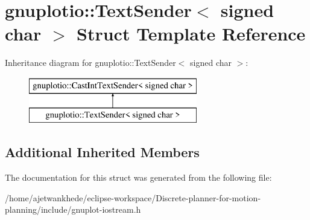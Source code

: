 \hypertarget{structgnuplotio_1_1TextSender_3_01signed_01char_01_4}{}\section{gnuplotio\+:\+:Text\+Sender$<$ signed char $>$ Struct Template Reference}
\label{structgnuplotio_1_1TextSender_3_01signed_01char_01_4}
Inheritance diagram for gnuplotio\+:\+:Text\+Sender$<$ signed char $>$\+:\begin{figure}[H]
\begin{center}
\leavevmode
\includegraphics[height=2.000000cm]{structgnuplotio_1_1TextSender_3_01signed_01char_01_4}
\end{center}
\end{figure}
\subsection*{Additional Inherited Members}


The documentation for this struct was generated from the following file\+:\begin{DoxyCompactItemize}
\item 
/home/ajetwankhede/eclipse-\/workspace/\+Discrete-\/planner-\/for-\/motion-\/planning/include/gnuplot-\/iostream.\+h\end{DoxyCompactItemize}
